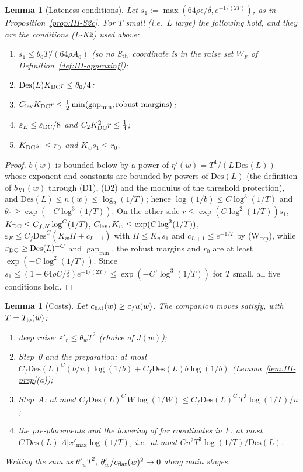 \documentclass[10pt]{amsart}
\newtheorem{lemma}[theorem]{Lemma}
\theoremstyle{definition}
\theoremstyle{remark}
\newcommand{\gap}{\operatorname{gap}}
\begin{document}
\begin{lemma}[Lateness conditions]\label{lem:III-late}
Let $s_1:=\max(64\rho\epsilon/\delta,e^{-1/(2T)})$, as in
Proposition~\textup{\ref{prop:III-S2c}}.  For $T$ small \textup{(}i.e.\ $L$
large\textup{)} the following hold, and they are the conditions \textup{(L-K2)}
used above:
\begin{enumerate}
\item[(L1)] $s_1\le\theta_0T/(64\rho A_0)$ \textup{(}so no S$_{\rm th}$
coordinate is in the raise set $W_F$ of Definition~\textup{\ref{def:III-approxinf}}\textup{)};
\item[(L2)] $\mathrm{Des}(L)K_{\rm DC}r\le\theta_0/4$;
\item[(L3)] $C_{\rm lev}K_{\rm DC}r\le\frac12\min(\gap_{\min},\text{robust
margins})$;
\item[(L4)] $\varepsilon_E\le\varepsilon_{\rm DC}/8$ and $C_2K_{\rm DC}^2r\le\frac14$;
\item[(L5)] $K_{\rm DC}s_1\le r_0$ and $K_w s_1\le r_0$.
\end{enumerate}
\end{lemma}

\begin{proof}
$b(w)$ is bounded below by a power of $\eta'(w)=T^4/(L\,\mathrm{Des}(L))$ whose
exponent and constants are bounded by powers of $\mathrm{Des}(L)$ (the
definition of $b_{X1}(w)$ through (D1), (D2) and the modulus of the threshold
protection), and $\mathrm{Des}(L)\le n(w)\le\log_2(1/T)$; hence $\log(1/b)\le
C\log^3(1/T)$ and $\theta_0\ge\exp(-C\log^3(1/T))$.  On the other side
$r\le\exp(C\log^2(1/T))s_1$, $K_{\rm DC}\le C_{f,N}\log^{C}(1/T)$, $C_{\rm lev},
K_w\le\exp(C\log^2(1/T))$, $\varepsilon_E\le C_f\mathrm{Des}^C(K_w\Pi+c_{L+1})$
with $\Pi\le K_ws_1$ and $c_{L+1}\le e^{-1/T}$ by (W$_{\exp}$), while
$\varepsilon_{\rm DC}\ge\mathrm{Des}(L)^{-C}$ and $\gap_{\min}$, the robust margins
and $r_0$ are at least $\exp(-C\log^2(1/T))$.  Since $s_1\le(1+64\rho C/\delta)
e^{-1/(2T)}\le\exp(-C'\log^3(1/T))$ for $T$ small, all five conditions hold.
\end{proof}

\begin{lemma}[Costs]\label{lem:III-costs}
Let $c_{\rm flat}(w)\ge c_fu(w)$.  The companion moves satisfy, with
$T=T_{\rm lo}(w)$:
\begin{enumerate}
\item[(a)] deep raise: $\varepsilon'_r\le\theta_wT^2$ (choice of $J(w)$);
\item[(b)] Step~0 and the preparation: at most $C_f\mathrm{Des}(L)^C(b/u)
\log(1/b)+C_f\mathrm{Des}(L)b\log(1/b)$ \textup{(}Lemma~\ref{lem:III-prep}(a)\textup{)};
\item[(c)] Step~A: at most $C_f\mathrm{Des}(L)^C\,W\log(1/W)\le
C_f\mathrm{Des}(L)^C\,T^3\log(1/T)/u$;
\item[(d)] the pre-placements and the lowering of far coordinates in $F$:
at most $C\,\mathrm{Des}(L)|\Lambda|x'_{\max}\log(1/T)$, i.e.\ at most
$Cu^2T^3\log(1/T)/\mathrm{Des}(L)$.
\end{enumerate}
Writing the sum as $\theta'_wT^2$, $\theta'_w/c_{\rm flat}(w)^2\to0$ along
main stages.
\end{lemma}
\end{document}
